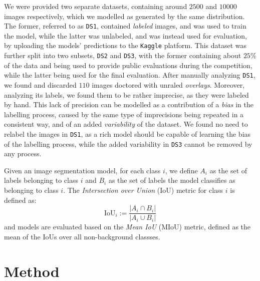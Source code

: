 \documentclass[11pt]{article}
\begin{document}
\begin{multicols}{2}

      We were provided two separate datasets, containing around $2500$ and $10000$ images respectively, which we modelled as generated by the same distribution. The former, referred to as \texttt{DS1}, contained \textit{labeled} images, and was used to train the model, while the latter was unlabeled, and was instead used for evaluation, by uploading the models' predictions to the \texttt{Kaggle}\cite{kaggle} platform. This dataset was further split into two subsets, \texttt{DS2} and \texttt{DS3}, with the former containing about $25\%$ of the data and being used to provide public evaluations during the competition, while the latter being used for the final evaluation. After manually analyzing \texttt{DS1}, we found and discarded $110$ images doctored with unraled \textit{overlays}. Moreover, analyzing its labels, we found them to be rather imprecise, as they were labeled by hand. This lack of precision can be modelled as a contribution of a \textit{bias} in the labelling process, caused by the same type of imprecisions being repeated in a consistent way, and of an added \textit{variability} of the dataset. We found no need to relabel the images in \texttt{DS1}, as a rich model should be capable of learning the bias of the labelling process, while the added variability in \texttt{DS3} cannot be removed by any process.

      Given an image segmentation model, for each class $i$, we define $A_i$ as the set of labels belonging to class $i$ and $B_i$ as the set of labels the model classifies as belonging to class $i$. The \textit{Intersection over Union} (IoU) metric for class $i$ is defined as: $$\text{IoU}_i := \dfrac{|A_i \cap B_i|}{|A_i \cup B_i|}$$ and models are evaluated based on the \textit{Mean IoU} (MIoU) metric, defined as the mean of the IoUs over all non-background classses.

      \section{Method}


\end{multicols}
\end{document}
